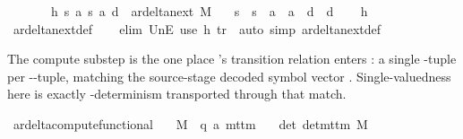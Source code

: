 \begin{isabellebody}
\ \ \ \ \ \ \ h{}{\isacharcolon}{\kern0pt}\ {\isachardoublequoteopen}{\isacharparenleft}{\kern0pt}s{\isacharcomma}{\kern0pt}\ a{\isacharcomma}{\kern0pt}\ s{}{\isacharcomma}{\kern0pt}\ a{}{\isacharcomma}{\kern0pt}\ d{}{\isacharparenright}{\kern0pt}\ {\isasymin}\ ar{\isacharunderscore}{\kern0pt}delta{\isacharunderscore}{\kern0pt}next\ M{\isachardoublequoteclose}\isanewline
\ \ \ {\isachardoublequoteopen}s{}\ {\isacharequal}{\kern0pt}\ s{}\ {\isasymand}\ a{}\ {\isacharequal}{\kern0pt}\ a{}\ {\isasymand}\ d{}\ {\isacharequal}{\kern0pt}\ d{}{\isachardoublequoteclose}\isanewline
%
\isadelimproof
\ \ %
\endisadelimproof
%
\isatagproof
{}\isamarkupfalse%
\ h{}\ \isamarkupfalse%
\ ar{\isacharunderscore}{\kern0pt}delta{\isacharunderscore}{\kern0pt}next{\isacharunderscore}{\kern0pt}def\isanewline
\ \ \isamarkupfalse%
\ {\isacharparenleft}{\kern0pt}elim\ UnE{\isacharsemicolon}{\kern0pt}\ use\ h{}\ tr\ \ {\isacartoucheopen}auto\ simp{\isacharcolon}{\kern0pt}\ ar{\isacharunderscore}{\kern0pt}delta{\isacharunderscore}{\kern0pt}next{\isacharunderscore}{\kern0pt}def{\isacartoucheclose}{\isacharparenright}{\kern0pt}%
\endisatagproof
{\isafoldproof}%
%
\isadelimproof
%
\endisadelimproof
%
\begin{isamarkuptext}%
The compute substep is the one place 's transition
  relation enters : a single
  \isa{{\isasymdelta}{\isacharprime}{\kern0pt}}-tuple per -\isa{{\isasymdelta}}-tuple, matching the
  source-stage decoded symbol vector .  Single-valuedness
  here is exactly -determinism transported through that match.%
\end{isamarkuptext}\isamarkuptrue%
\isamarkupfalse%
\ ar{\isacharunderscore}{\kern0pt}delta{\isacharunderscore}{\kern0pt}compute{\isacharunderscore}{\kern0pt}functional{\isacharcolon}{\kern0pt}\isanewline
\ \ \ M\ {\isacharcolon}{\kern0pt}{\isacharcolon}{\kern0pt}\ {\isachardoublequoteopen}{\isacharparenleft}{\kern0pt}{\isacharprime}{\kern0pt}q{\isacharcomma}{\kern0pt}\ {\isacharprime}{\kern0pt}a{\isacharparenright}{\kern0pt}\ mttm{\isachardoublequoteclose}\isanewline
\ \ \ det{\isacharcolon}{\kern0pt}\ {\isachardoublequoteopen}det{\isacharunderscore}{\kern0pt}mttm\ M{\isachardoublequoteclose}\isanewline

\end{isabellebody}

